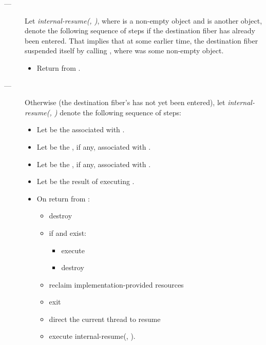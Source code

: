 \begin{description}
    \item[---]
          Let \emph{internal-resume(, )},
          where  is a non-empty \fiber object and  is
          another \fiber object, denote the following sequence of steps if the
          destination fiber has already been entered. That implies that at
          some earlier time, the destination fiber suspended itself by
          calling \resumewith[other], where  was some
          non-empty \fiber object.
        \begin{itemize}
            \item Return  from \resumewith[other].
        \end{itemize}   
    \item[---] Otherwise (the destination fiber's \entryfn has not
          yet been entered), let \emph{internal-resume(, )}
          denote the following sequence of steps:
        \begin{itemize}
            \item Let  be the  associated with .
            \item Let  be the , if any, associated with .
            \item Let  be the , if any, associated with .
            \item Let  be the result of executing
                  .
            \item On return from :
            \begin{itemize}
                \item destroy 
                \item if  and  exist:
                    \begin{itemize}
                        \item execute 
                        \item destroy 
                    \end{itemize}
                \item reclaim implementation-provided resources
                \item exit 
                \item direct the current thread to resume 
                \item execute internal-resume(, ).
            \end{itemize}
        \end{itemize}
\end{description}

